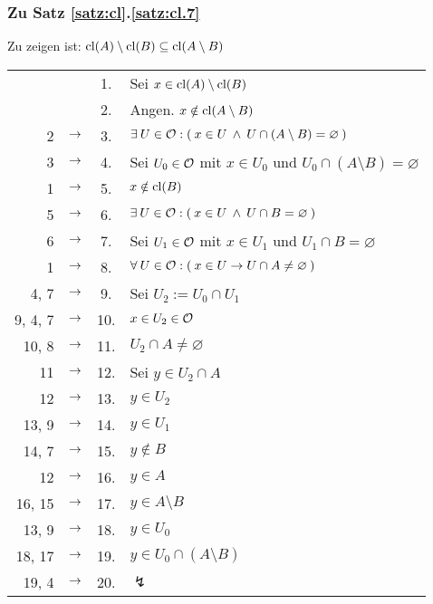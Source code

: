 \subsubsection{Zu Satz \ref{satz:cl}.\ref{satz:cl.7}} 
    Zu zeigen ist: $\text{cl}(A) \setminus \text{cl}(B) \subseteq \text{cl}(A \setminus B)$

    \begin{longtable}{r c c l}
        & & 1. & Sei $x \in \text{cl}(A) \setminus \text{cl}(B)$ \\
        & & 2. & Angen. $x \notin \text{cl}(A \setminus B)$ \\
        2 & $\rightarrow$ & 3. & $\exists\: U \in \mathcal{O} : (\: x \in U \:\land\: U \cap (A \setminus B) = \varnothing \:)$ \\
        3 & $\rightarrow$ & 4. & Sei $U_0 \in \mathcal{O}$ mit $x \in U_0$ und $U_0 \cap (A \setminus B) = \varnothing$ \\
        1 & $\rightarrow$ & 5. & $x \notin \text{cl}(B)$ \\
        5 & $\rightarrow$ & 6. & $\exists\: U \in \mathcal{O} : (\: x \in U \:\land\: U \cap B = \varnothing \:)$ \\
        6 & $\rightarrow$ & 7. & Sei $U_1 \in \mathcal{O}$ mit $x \in U_1$ und $U_1 \cap B = \varnothing$ \\
        1 & $\rightarrow$ & 8. & $\forall\: U \in \mathcal{O} : (\: x \in U \to U \cap A \neq \varnothing \:)$ \\
        4, 7 & $\rightarrow$ & 9. & Sei $U_2 := U_0 \cap U_1$ \\
        9, 4, 7 & $\rightarrow$ & 10. & $x \in U_2 \in \mathcal{O}$ \\
        10, 8 & $\rightarrow$ & 11. & $U_2 \cap A \neq \varnothing$ \\
        11 & $\rightarrow$ & 12. & Sei $y \in U_2 \cap A$ \\
        12 & $\rightarrow$ & 13. & $y \in U_2$ \\
        13, 9 & $\rightarrow$ & 14. & $y \in U_1$ \\
        14, 7 & $\rightarrow$ & 15. & $y \notin B$ \\
        12 & $\rightarrow$ & 16. & $y \in A$ \\
        16, 15 & $\rightarrow$ & 17. & $y \in A \setminus B$ \\
        13, 9 & $\rightarrow$ & 18. & $y \in U_0$ \\
        18, 17 & $\rightarrow$ & 19. & $y \in U_0 \cap (A \setminus B)$ \\
        19, 4 & $\rightarrow$ & 20. & $\lightning$
    \end{longtable}


